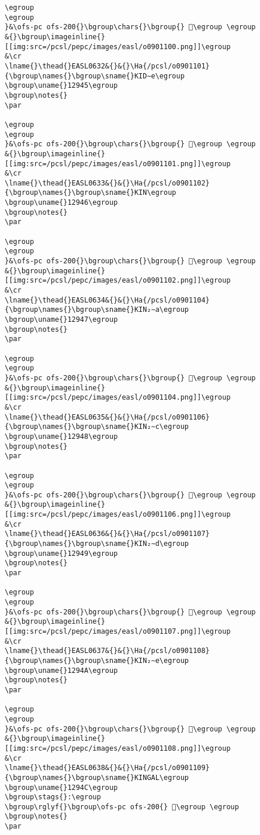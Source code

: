 \begin{verbatim}
\egroup
\egroup
}&\ofs-pc ofs-200{}\bgroup\chars{}\bgroup{} 𒥄\egroup \egroup
&{}\bgroup\imageinline{}[[img:src=/pcsl/pepc/images/easl/o0901100.png]]\egroup
&\cr
\lname{}\thead{}EASL0632&{}&{}\Ha{/pcsl/o0901101}{\bgroup\names{}\bgroup\sname{}KID∼e\egroup
\bgroup\uname{}12945\egroup
\bgroup\notes{}
\par 

\egroup
\egroup
}&\ofs-pc ofs-200{}\bgroup\chars{}\bgroup{} 𒥅\egroup \egroup
&{}\bgroup\imageinline{}[[img:src=/pcsl/pepc/images/easl/o0901101.png]]\egroup
&\cr
\lname{}\thead{}EASL0633&{}&{}\Ha{/pcsl/o0901102}{\bgroup\names{}\bgroup\sname{}KIN\egroup
\bgroup\uname{}12946\egroup
\bgroup\notes{}
\par 

\egroup
\egroup
}&\ofs-pc ofs-200{}\bgroup\chars{}\bgroup{} 𒥆\egroup \egroup
&{}\bgroup\imageinline{}[[img:src=/pcsl/pepc/images/easl/o0901102.png]]\egroup
&\cr
\lname{}\thead{}EASL0634&{}&{}\Ha{/pcsl/o0901104}{\bgroup\names{}\bgroup\sname{}KIN₂∼a\egroup
\bgroup\uname{}12947\egroup
\bgroup\notes{}
\par 

\egroup
\egroup
}&\ofs-pc ofs-200{}\bgroup\chars{}\bgroup{} 𒥇\egroup \egroup
&{}\bgroup\imageinline{}[[img:src=/pcsl/pepc/images/easl/o0901104.png]]\egroup
&\cr
\lname{}\thead{}EASL0635&{}&{}\Ha{/pcsl/o0901106}{\bgroup\names{}\bgroup\sname{}KIN₂∼c\egroup
\bgroup\uname{}12948\egroup
\bgroup\notes{}
\par 

\egroup
\egroup
}&\ofs-pc ofs-200{}\bgroup\chars{}\bgroup{} 𒥈\egroup \egroup
&{}\bgroup\imageinline{}[[img:src=/pcsl/pepc/images/easl/o0901106.png]]\egroup
&\cr
\lname{}\thead{}EASL0636&{}&{}\Ha{/pcsl/o0901107}{\bgroup\names{}\bgroup\sname{}KIN₂∼d\egroup
\bgroup\uname{}12949\egroup
\bgroup\notes{}
\par 

\egroup
\egroup
}&\ofs-pc ofs-200{}\bgroup\chars{}\bgroup{} 𒥉\egroup \egroup
&{}\bgroup\imageinline{}[[img:src=/pcsl/pepc/images/easl/o0901107.png]]\egroup
&\cr
\lname{}\thead{}EASL0637&{}&{}\Ha{/pcsl/o0901108}{\bgroup\names{}\bgroup\sname{}KIN₂∼e\egroup
\bgroup\uname{}1294A\egroup
\bgroup\notes{}
\par 

\egroup
\egroup
}&\ofs-pc ofs-200{}\bgroup\chars{}\bgroup{} 𒥊\egroup \egroup
&{}\bgroup\imageinline{}[[img:src=/pcsl/pepc/images/easl/o0901108.png]]\egroup
&\cr
\lname{}\thead{}EASL0638&{}&{}\Ha{/pcsl/o0901109}{\bgroup\names{}\bgroup\sname{}KINGAL\egroup
\bgroup\uname{}1294C\egroup
\bgroup\stags{}:\egroup
\bgroup\rglyf{}\bgroup\ofs-pc ofs-200{} 𒥌\egroup \egroup
\bgroup\notes{}
\par 


\end{verbatim}
